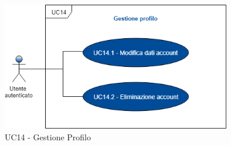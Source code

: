 \begin{figure}[h]
	\includegraphics[width=10cm]{res/images/UC14Profilo.png}
	\centering
	\caption{UC14 - Gestione Profilo}
\end{figure} 


